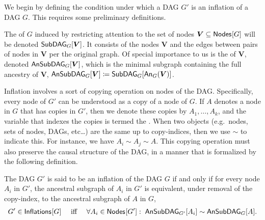 We begin by defining the condition under which a DAG $G'$  is an inflation of a DAG $G$.  This requires some preliminary definitions. 

The  of $G$ induced by restricting attention to the set of nodes $\bm{V}\subseteq \SmallNamedFunction{Nodes}{G}$ will be denoted $\subgraph[G]{\bm{V}}$.
It consists of the nodes $\bm{V}$ and the edges between pairs of nodes in $\bm{V}$ per the original graph. Of special importance to us is the 
 of $\bm{V}$, denoted $\ansubgraph[G]{\bm{V}}$, which is the minimal subgraph containing the full ancestry of $\bm{V}$, $\ansubgraph[G]{\bm{V}}\coloneqq\subgraph[G]{\An[G]{\bm{V}}}$. 

Inflation involves a sort of copying operation on nodes of the DAG.  Specifically, every node of $G'$ can be understood as a copy of a node of $G$.    If $A$ denotes a node in $G$ that has copies in $G'$, then we denote these copies by $A_1,\ldots, A_k$, and the variable that indexes the copies is termed the .  When two objects (e.g.~nodes, sets of nodes, DAGs, etc\ldots) are the same up to copy-indices, then we use $\sim$ to indicate this.  For instance, we have $A_i\sim A_j\sim A$.   This copying operation must also preserve the causal structure of the DAG, in a manner that is formalized by the following definition. 
\begin{definition}
The DAG $G'$ is said to be an inflation of the DAG $G$ if and only if  for every node $A_i$ in $G'$, the ancestral subgraph of $A_i$ in $G'$ is equivalent, under removal of the copy-index, to the ancestral subgraph of $A$ in $G$,
\begin{align}\label{eq:definflationDAG}
G' \in\SmallNamedFunction{Inflations}{G} \quad\text{ iff }\quad \forall A_i\in \SmallNamedFunction{Nodes}{G'}:\; \ansubgraph[G']{A_i}\sim\ansubgraph[G]{A}.
\end{align}
\end{definition}

